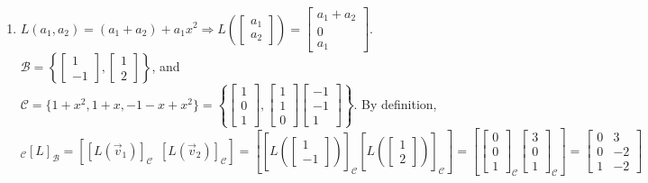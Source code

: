 \documentclass[10pt,english]{article}
\begin{document}
\begin{enumerate}
\pagebreak
\item $L(a_1,a_2)=(a_1+a_2)+a_1x^2\Rightarrow L\left(\begin{bmatrix}a_1\\a_2\end{bmatrix}\right)=\begin{bmatrix}a_1+a_2\\0\\a_1\end{bmatrix}$. $\mathcal{B}=\left\{\begin{bmatrix}1\\-1\end{bmatrix},\begin{bmatrix}1\\2\end{bmatrix}\right\}$, and $\mathcal{C}=\{1+x^2,1+x,-1-x+x^2\}=\left\{\begin{bmatrix}1\\0\\1\end{bmatrix},\begin{bmatrix}1\\1\\0\end{bmatrix}\begin{bmatrix}-1\\-1\\1\end{bmatrix}\right\}$. By definition, $_\mathcal{C}[L]_\mathcal{B}=\left[[L(\vec{v}_1)]_\mathcal{C}\,\,\,[L(\vec{v}_2)]_\mathcal{C}\right]=\left[[L\left(\begin{bmatrix}1\\-1\end{bmatrix}\right)]_\mathcal{C}[L\left(\begin{bmatrix}1\\2\end{bmatrix}\right)]_\mathcal{C}\right]=\left[\begin{bmatrix}0\\0\\1\end{bmatrix}_\mathcal{C}\begin{bmatrix}3\\0\\1\end{bmatrix}_\mathcal{C}\right]=\begin{bmatrix}0&3\\0&-2\\1&-2\end{bmatrix}$


\end{enumerate}
\end{document}
